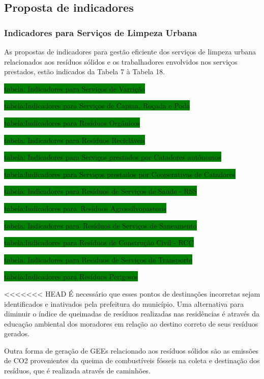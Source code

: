 	\subsection{Proposta de indicadores}
	\subsubsection{Indicadores para Serviços de Limpeza Urbana }
	As propostas de indicadores para gestão eficiente dos serviços de limpeza urbana relacionados aos resíduos sólidos e os trabalhadores envolvidos nos serviços prestados, estão indicados da Tabela 7 à Tabela 18.
	
	\colorbox{green}{tabela: Indicadores para Serviços de Varrição}
	
	\colorbox{green}{tabela:Indicadores para Serviços de Capina, Roçada e Poda}
	
	\colorbox{green}{tabela:Indicadores para Resíduos Orgânicos}
	
	\colorbox{green}{tabela: Indicadores para Resíduos Recicláveis}
	
	\colorbox{green}{tabela: Indicadores para Serviços prestados por Catadores autônomos}
	
	\colorbox{green}{tabela:Indicadores para Serviços prestados por Cooperativas de Catadores}
	
	\colorbox{green}{tabela: Indicadores para Resíduos de Serviços de Saúde - RSS}
	
	\colorbox{green}{tabela:Indicadores para Resíduos Agrossilvopastoris}
	
	\colorbox{green}{tabela: Indicadores para Resíduos de Serviços de Saneamento}
	
	\colorbox{green}{tabela:Indicadores para Resíduos de Construção Civil - RCC}
	
	\colorbox{green}{tabela: Indicadores para Resíduos de Serviços de Transporte}
	
	\colorbox{green}{tabela:Indicadores para Resíduos Perigosos}
	
<<<<<<< HEAD
	É necessário que esses pontos de destinações incorretas sejam identificados e inativados pela prefeitura do município. Uma alternativa para diminuir o índice de queimadas de resíduos realizadas nas residências é através da educação ambiental dos moradores em relação ao destino correto de seus resíduos gerados.  
	
	Outra forma de geração de GEEs relacionado aos resíduos sólidos são as emissões de CO2 provenientes da queima de combustíveis fósseis na coleta e destinação dos resíduos, que é realizada através de caminhões. 
	
